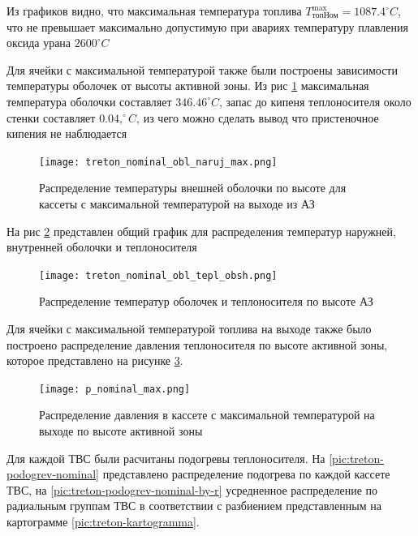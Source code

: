 Из графиков видно, что максимальная температура топлива
$T_{\text{топ} \text{Ном}}^{\max} = 1087.4 ^\circ C$, что не превышает максимально допустимую при авариях температуру плавления оксида урана $2600 ^\circ C$

Для ячейки с максимальной температурой также были построены зависимости температуры оболочек от высоты активной зоны. Из рис \ref{pic:treton-t-obl-naruj-nominal-max} максимальная температура оболочки составляет $346.46 ^\circ C$, запас до кипеня теплоносителя около стенки составляет $0.04, ^\circ C$, из чего можно сделать вывод что пристеночное кипения не наблюдается

\begin{figure}[H]
	\begin{center}
		\texttt{[image: treton\_nominal\_obl\_naruj\_max.png]}
		\caption{Распределение температуры внешней оболочки по высоте для кассеты с максимальной температурой на выходе из АЗ}
		\label{pic:treton-t-obl-naruj-nominal-max} %
	\end{center}
\end{figure}

На рис \ref{pic:treton-obl-tepl-obsh-nominal} представлен  общий график для распределения температур наружней, внутренней оболочки и теплоносителя

\begin{figure}[H]
	\begin{center}
		\texttt{[image: treton\_nominal\_obl\_tepl\_obsh.png]}
		\caption{Распределение температур оболочек и теплоносителя по высоте АЗ}
		\label{pic:treton-obl-tepl-obsh-nominal} %
	\end{center}
\end{figure}

Для ячейки с максимальной температурой топлива на выходе также было построено распределение давления теплоносителя по высоте активной зоны, которое представлено на рисунке \ref{pic:treton-p-nominal-max}.

\begin{figure}[H]
	\begin{center}
		\texttt{[image: p\_nominal\_max.png]}
		\caption{Распределение давления в кассете с максимальной температурой на выходе по высоте активной зоны}
		\label{pic:treton-p-nominal-max} %
	\end{center}
\end{figure}

Для каждой ТВС были расчитаны подогревы теплоносителя. На \ref{pic:treton-podogrev-nominal} представлено распределение подогрева по каждой кассете ТВС, на \ref{pic:treton-podogrev-nominal-by-r} усредненное распределение по радиальным группам ТВС в соответствии с разбиением представленным на картограмме \ref{pic:treton-kartogramma}.


